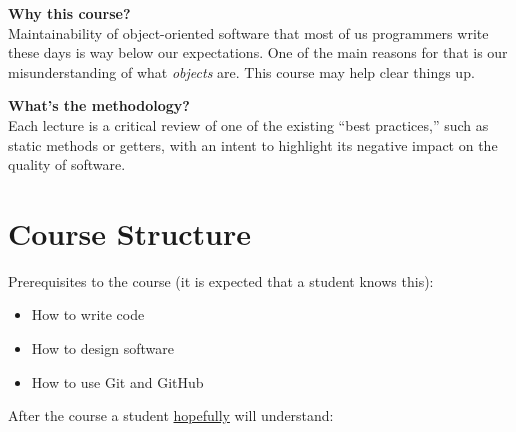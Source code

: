 \documentclass[nobrand,anonymous,nodate,nosecurity]{huawei}
\begin{document}
\textbf{Why this course?}\\
Maintainability of object-oriented software that most of us programmers write these days is
way below our expectations. One of the main reasons for that is our misunderstanding
of what \emph{objects} are. This course may help clear things up.

\textbf{What's the methodology?}\\
Each lecture is a critical review of one of the existing ``best practices,'' such as
static methods or getters, with an intent to highlight its negative impact
on the quality of software.

\newpage
\section*{Course Structure}

Prerequisites to the course (it is expected that a student knows this):

\begin{itemize}
\item How to write code
\item How to design software
\item How to use Git and GitHub
\end{itemize}

After the course a student \ul{hopefully} will understand:
\end{document}
